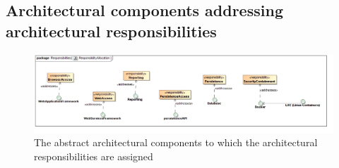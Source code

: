 \subsection{Architectural components addressing architectural responsibilities}
\begin{figure}[H]
	\begin{center}
	\includegraphics[scale=0.4]{../Diagrams and Charts/Architecture/ResponsibilityAllocation.jpg}
	\caption{The abstract architectural components to which the architectural responsibilities are assigned}
	\end{center}
	\label{ref:responsibilityAllocation}
\end{figure}